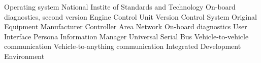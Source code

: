 		{Operating system}
		{National Instite of Standards and Technology}
		{On-board diagnostics, second version}
		{Engine Control Unit}
		{Version Control System}
		{Original Equipment Manufacturer}
		{Controller Area Network}
		{On-board diagnostics}
		{User Interface}
		{Persona Information Manager}
		{Universal Serial Bus}
		{Vehicle-to-vehicle communication}
		{Vehicle-to-anything communication}
		{Integrated Development Environment}